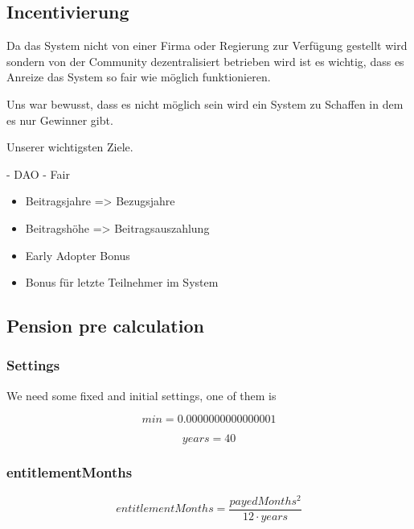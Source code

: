 \subsection{Incentivierung}

Da das System nicht von einer Firma oder Regierung zur Verfügung gestellt wird sondern von der Community dezentralisiert betrieben wird ist es wichtig, dass es Anreize das System so fair wie möglich funktionieren.

Uns war bewusst, dass es nicht möglich sein wird ein System zu Schaffen in dem es nur Gewinner gibt.

Unserer wichtigsten Ziele.

- DAO
- Fair



\begin{itemize}
\item Beitragsjahre => Bezugsjahre
\item Beitragshöhe => Beitragsauszahlung
\item Early Adopter Bonus
\item Bonus für letzte Teilnehmer im System
\end{itemize}


\newpage

\subsection{Pension pre calculation}

\subsubsection*{Settings}

We need some fixed and initial settings,
one of them is 

\begin{equation*}
	min = 0.0000000000000001
\end{equation*}

\begin{equation*}
	years = 40
\end{equation*}

\subsubsection*{entitlementMonths}

\begin{equation*}
	entitlementMonths = \frac{payedMonths^2}{12 \cdot years}
\end{equation*}

